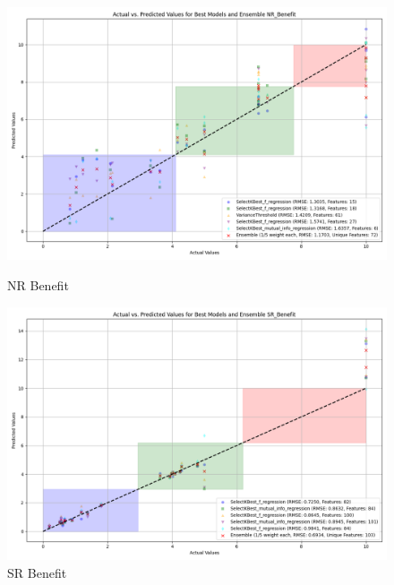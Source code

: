 \begin{figure}[H]
    \centering
    \begin{minipage}{0.45\textwidth}
        \centering
        \includegraphics[width=\linewidth]{reg_section_all/images_reg_featred_ensemble/actual_vs_predicted_best_feature_selection_and_ensemble_NR_Benefit.png}
        \caption{NR Benefit}
        \label{fig:nr_ben_reg_featred_best_ensemble}
    \end{minipage}\hfill
    \begin{minipage}{0.45\textwidth}
        \centering
        \includegraphics[width=\linewidth]{reg_section_all/images_reg_featred_ensemble/actual_vs_predicted_best_feature_selection_and_ensemble_SR_Benefit.png}
        \caption{SR Benefit}
        \label{fig:sr_ben_reg_featred_best_ensemble}
    \end{minipage}
\end{figure}

